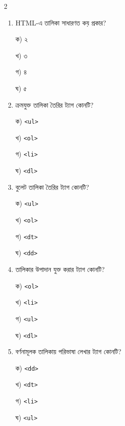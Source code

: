 \begin{multicols}{2}
\begin{enumerate}[leftmargin=*,itemsep=5pt]
\item \begin{minipage}[t]{\linewidth}\vspace{0pt}
HTML-এ তালিকা সাধারণত কয় প্রকার?
\par ক) ২
\par খ) ৩
\par গ) ৪
\par ঘ) ৫
\end{minipage}

\item \begin{minipage}[t]{\linewidth}\vspace{0pt}
ক্রমযুক্ত তালিকা তৈরির ট্যাগ কোনটি?
\par ক) \texttt{<ul>}
\par খ) \texttt{<ol>}
\par গ) \texttt{<li>}
\par ঘ) \texttt{<dl>}
\end{minipage}

\item \begin{minipage}[t]{\linewidth}\vspace{0pt}
বুলেট তালিকা তৈরির ট্যাগ কোনটি?
\par ক) \texttt{<ul>}
\par খ) \texttt{<ol>}
\par গ) \texttt{<dt>}
\par ঘ) \texttt{<dd>}
\end{minipage}

\item \begin{minipage}[t]{\linewidth}\vspace{0pt}
তালিকার উপাদান যুক্ত করার ট্যাগ কোনটি?
\par ক) \texttt{<ol>}
\par খ) \texttt{<li>}
\par গ) \texttt{<ul>}
\par ঘ) \texttt{<dl>}
\end{minipage}

\item \begin{minipage}[t]{\linewidth}\vspace{0pt}
বর্ণনামূলক তালিকায় পরিভাষা লেখার ট্যাগ কোনটি?
\par ক) \texttt{<dd>}
\par খ) \texttt{<dt>}
\par গ) \texttt{<li>}
\par ঘ) \texttt{<ul>}
\end{minipage}


\end{enumerate}
\end{multicols}
